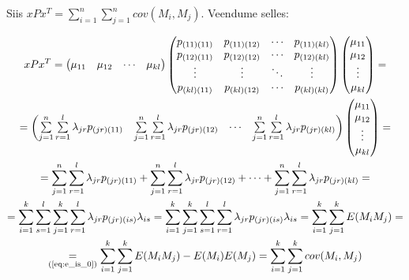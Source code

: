 \documentclass[a4paper,12pt,oneside]{article}
\newenvironment{tightcenter}{%
  \setlength\topsep{0pt}
  \setlength\parskip{0pt}
  \begin{center}
}{%
  \end{center}
}
\numberwithin{equation}{section}
\theoremstyle{definition}
\begin{document}
Siis $xPx^T = \sum \limits_{i=1}^n \sum \limits_{j=1}^n cov(M_i,M_j)$. Veendume selles:
\begin{tightcenter}
\begin{equation*}
\begin{gathered}
xPx^T =
\begin{pmatrix}
\mu_{11} & \mu_{12} & \cdots & \mu_{kl} 
\end{pmatrix}
\begin{pmatrix}
p_{(11)(11)}&p_{(11)(12)}&\cdots&p_{(11)(kl)} \\
p_{(12)(11)}&p_{(12)(12)}&\cdots&p_{(12)(kl)} \\
\vdots&\vdots&\ddots&\vdots \\
p_{(kl)(11)}&p_{(kl)(12)}&\cdots&p_{(kl)(kl)} \\
\end{pmatrix} 
\begin{pmatrix}
\mu_{11} \\
\mu_{12} \\
\vdots \\
\mu_{kl}
\end{pmatrix}
= \\
= 
\begin{pmatrix}
\sum \limits_{j=1}^n \sum \limits_{r=1}^l \lambda_{jr}p_{(jr)(11)} & \sum \limits_{j=1}^n \sum \limits_{r=1}^l \lambda_{jr}p_{(jr)(12)} & \cdots &  \sum \limits_{j=1}^n \sum \limits_{r=1}^l \lambda_{jr}p_{(jr)(kl)} \\
\end{pmatrix}
\begin{pmatrix}
\mu_{11} \\
\mu_{12} \\
\vdots \\
\mu_{kl}
\end{pmatrix}
=\\
=
\sum \limits_{j=1}^n \sum \limits_{r=1}^l \lambda_{jr}p_{(jr)(11)} + \sum \limits_{j=1}^n \sum \limits_{r=1}^l \lambda_{jr}p_{(jr)(12)} + \cdots +  \sum \limits_{j=1}^n \sum \limits_{r=1}^l \lambda_{jr}p_{(jr)(kl)}=\\
= \sum \limits_{i=1}^{k} \sum \limits_{s=1}^{l} \sum \limits_{j=1}^k \sum \limits_{r=1}^l \lambda_{jr}p_{(jr)(is)} \lambda_{is} 
= \sum \limits_{i=1}^{k}  \sum \limits_{j=1}^k \sum \limits_{s=1}^{l} \sum \limits_{r=1}^l \lambda_{jr}p_{(jr)(is)} \lambda_{is} =
\sum \limits_{i=1}^{k} \sum \limits_{j=1}^k E(M_iM_j) = \\
\underset{\text{(\ref{eq:e_is_0})}}{=} \sum \limits_{i=1}^{k} \sum \limits_{j=1}^k E(M_iM_j) - E(M_i)E(M_j) = \sum \limits_{i=1}^{k} \sum \limits_{j=1}^k cov(M_i,M_j)
\end{gathered}
\end{equation*}
\end{tightcenter}
\end{document}
